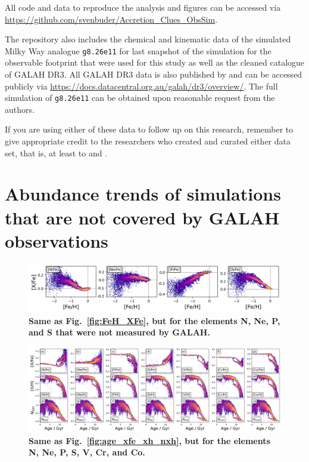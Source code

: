 \documentclass[fleqn,usenatbib]{mnras}
\begin{document}
All code and data to reproduce the analysis and figures can be accessed via \url{https://github.com/svenbuder/Accretion_Clues_ObsSim}.

The repository also includes the chemical and kinematic data of the simulated Milky Way analogue \texttt{g8.26e11} for last snapshot of the simulation for the observable footprint that were used for this study as well as the cleaned catalogue of GALAH DR3. All GALAH DR3 data is also published by \citet{Buder2021} and can be accessed publicly via \url{https://docs.datacentral.org.au/galah/dr3/overview/}. The full simulation of \texttt{g8.26e11} can be obtained upon reasonable request from the authors.

If you are using either of these data to follow up on this research, remember to give appropriate credit to the researchers who created and curated either data set, that is, at least to \citet{Buder2021, Buder2022} and \citet{Buck2020b, Buck2021}.





\appendix

\section{Abundance trends of simulations that are not covered by GALAH observations} \label{sec:appendix_other_abundances}

\begin{figure}
	\includegraphics[width=\textwidth]{figures/Overview_FeH_XFe_Sim_only.png}
    \caption{
    \textbf{Same as Fig.~\ref{fig:FeH_XFe}, but for the elements N, Ne, P, and S that were not measured by GALAH.}
    }
    \label{fig:appendix_feh_xfe_nneps}
\end{figure}

\begin{figure}
	\includegraphics[width=\textwidth]{figures/age_xfe_xh_nxh_others.png}
    \caption{
    \textbf{Same as Fig.~\ref{fig:age_xfe_xh_nxh}, but for the elements N, Ne, P, S, V, Cr, and Co.}
    }
    \label{fig:appendix_xfe_xh_nx}
\end{figure}
\end{document}
